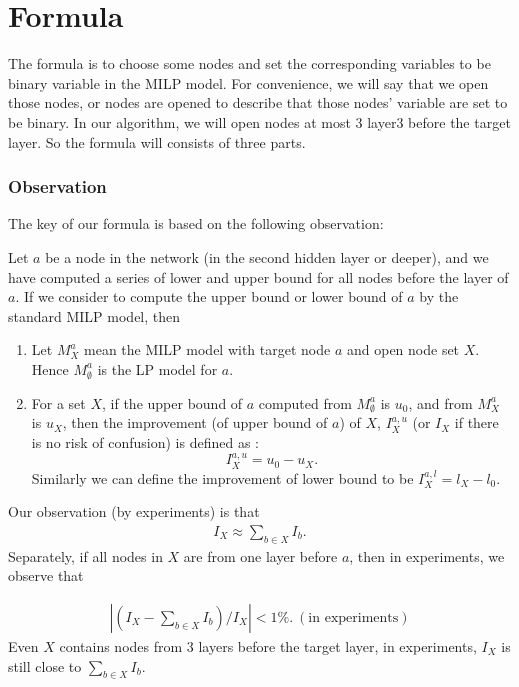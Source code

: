 \section*{Formula}

The formula is to choose some nodes and set the corresponding variables to be binary variable in the MILP model. For convenience, we will say that we open those nodes, or nodes are opened to describe that those nodes' variable are set to be binary. In our algorithm, we will open nodes at most 3 layer3 before the target layer. So the formula will consists of three parts.

\subsubsection*{Observation}

The key of our formula is based on the following observation:

\begin{definition}[Improvement]
	
	Let $a$ be a node in the network (in the second hidden layer or deeper), and we have computed a series of lower and upper bound for all nodes before the layer of $a$. If we consider to compute the upper bound or lower bound of $a$ by the standard MILP model, then
	
	\begin{enumerate}
		\item Let $M^a_X$ mean the MILP model with target node $a$ and open node set $X$. Hence $M^a_{\emptyset}$ is the LP model for $a$.
		
		\item For a set $X$, if the upper bound of $a$ computed from $M^a_{\emptyset}$ is $u_0$, and from $M^a_X$ is $u_X$, then the improvement (of upper bound of $a$) of $X$, $I_X^{a,u}$ (or $I_X$ if there is no risk of confusion) is defined as : $$I_X^{a,u} = u_0-u_X.$$ Similarly we can define the improvement of lower bound to be $I_X^{a,l} = l_X-l_0$.
	\end{enumerate}
\end{definition}



Our observation (by experiments) is that \begin{align}
	I_X \approx \sum_{b\in X} I_b.
\end{align} Separately, if all nodes in $X$ are from one layer before $a$, then in experiments, we observe that 

\begin{align}
	|(I_X - \sum_{b\in X} I_b)/I_X| < 1\%. \ (\text{in experiments})
\end{align} Even $X$ contains nodes from 3 layers before the target layer, in experiments, $I_X$ is still close to $\sum_{b\in X} I_b$.

